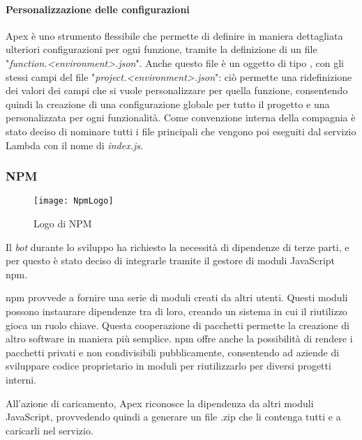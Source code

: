 \paragraph*{Personalizzazione delle configurazioni} Apex è uno strumento
flessibile che permette di definire in maniera dettagliata ulteriori
configurazioni per ogni funzione, tramite la definizione di un file
"\textit{function.<environment>.json}". Anche questo file è un oggetto di tipo
, con gli stessi campi del file
"\textit{project.<environment>.json}": ciò permette una ridefinizione dei valori
dei campi che si vuole personalizzare per quella funzione, consentendo quindi
la creazione di una configurazione globale per tutto il progetto e una
personalizzata per ogni funzionalità.
Come convenzione interna della compagnia è stato deciso di nominare tutti i
file principali che vengono poi eseguiti dal servizio Lambda con il nome di
\textit{index.js}.

\newpage

\subsubsection{NPM}
\begin{figure}[H]
  \centering
  \texttt{[image: NpmLogo]}
  \caption{Logo di NPM}
\end{figure}

Il \textit{bot} durante lo sviluppo ha richiesto la
necessità di dipendenze di terze parti, e per questo è stato deciso di
integrarle tramite il gestore di moduli JavaScript \gls{npm}.

\gls{npm} provvede a fornire una serie di moduli creati da altri utenti. Questi
moduli possono instaurare dipendenze tra di loro, creando un sistema in cui il
riutilizzo gioca un ruolo chiave.
Questa cooperazione di pacchetti permette la creazione di altro software in
maniera più semplice.
\gls{npm} offre anche la possibilità di rendere i pacchetti privati e non
condivisibili pubblicamente, consentendo ad aziende di sviluppare codice
proprietario in moduli per riutilizzarlo per diversi progetti interni.

All'azione di caricamento, Apex riconosce la dipendenza da altri moduli
JavaScript, provvedendo quindi a generare un file .zip che li contenga tutti e
a caricarli nel servizio.

